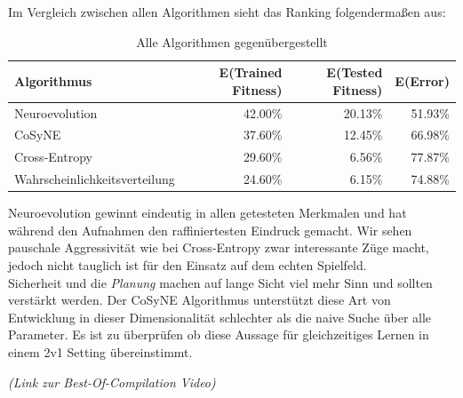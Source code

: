              Im Vergleich zwischen allen Algorithmen sieht das Ranking folgendermaßen aus:

                \begin{table}[H]
                    \begin{center}
                    \begin{tabular}{ |l|r|r|r| } 
                        \hline
                        \textbf{Algorithmus}          & E(Trained Fitness) & E(Tested Fitness) & E(Error)    \\ \hline
                        Neuroevolution                &          42.00\%   &         20.13\%   &    51.93\%  \\ \hline
                        CoSyNE                        &          37.60\%   &         12.45\%   &    66.98\%  \\ \hline
                        Cross-Entropy                 &          29.60\%   &          6.56\%   &    77.87\%  \\ \hline
                        Wahrscheinlichkeitsverteilung &          24.60\%   &          6.15\%   &    74.88\%  \\ \hline
                    \end{tabular}
                    \end{center}
                    \caption{Alle Algorithmen gegenübergestellt \label{fig:vergleichstabelle}}
                \end{table}

            \noindent
            Neuroevolution gewinnt eindeutig in allen getesteten Merkmalen und hat während den Aufnahmen den raffiniertesten Eindruck gemacht. Wir sehen pauschale Aggressivität wie bei Cross-Entropy zwar interessante Züge macht, jedoch nicht tauglich ist für den Einsatz auf dem echten Spielfeld. \\[2mm]

            \noindent
            Sicherheit und die \textit{Planung} machen auf lange Sicht viel mehr Sinn und sollten verstärkt werden. Der CoSyNE Algorithmus unterstützt diese Art von Entwicklung in dieser Dimensionalität schlechter als die naive Suche über alle Parameter. Es ist zu überprüfen ob diese Aussage für gleichzeitiges Lernen in einem 2v1 Setting übereinstimmt.\\[2mm]

            \begin{center} \textit{(Link zur Best-Of-Compilation Video)} \end{center}